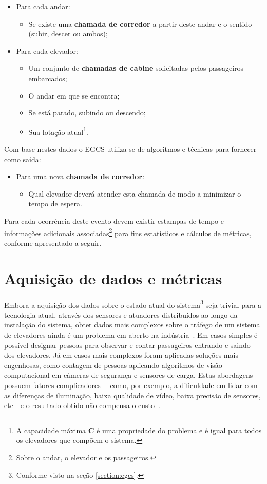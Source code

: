 \begin{itemize}
  \item Para cada andar:
  \begin{itemize}
    \item Se existe uma \textbf{chamada de corredor} a partir deste andar e o
          sentido (subir, descer ou ambos);
  \end{itemize}
  \item Para cada elevador:
  \begin{itemize}
    \item Um conjunto de \textbf{chamadas de cabine} solicitadas pelos
          passageiros embarcados;
    \item O andar em que se encontra;
    \item Se está parado, subindo ou descendo;
    \item Sua lotação atual\footnote{A capacidade máxima \textbf{C} é uma
          propriedade do problema e é igual para todos os elevadores que compõem
          o sistema.}.
  \end{itemize}
\end{itemize}

Com base nestes dados o EGCS utiliza-se de algoritmos e técnicas para fornecer
como saída:

\begin{itemize}
  \item Para uma nova \textbf{chamada de corredor}:
  \begin{itemize}
    \item Qual elevador deverá atender esta chamada de modo a minimizar o tempo de espera.
  \end{itemize}
\end{itemize}

Para cada ocorrência deste evento devem existir estampas de tempo e informações
adicionais associadas\footnote{Sobre o andar, o elevador e os passageiros.} para
fins estatísticos e cálculos de métricas, conforme apresentado a seguir.

\section{\label{section:data}Aquisição de dados e métricas}

Embora a aquisição dos dados sobre o estado atual do sistema\footnote{Conforme
visto na seção \ref{section:egcs}.} seja trivial para a tecnologia atual,
através dos sensores e atuadores distribuídos ao longo da instalação do sistema,
obter dados mais complexos sobre o tráfego de um sistema de elevadores ainda é
um problema em aberto na indústria~\cite{KOEHLEROTTIGER02}. Em casos simples é
possível designar pessoas para observar e contar passageiros entrando e saindo
dos elevadores. Já em casos mais complexos foram aplicadas soluções mais
engenhosas, como contagem de pessoas aplicando algoritmos de visão computacional
em câmeras de segurança e sensores de carga. Estas abordagens possuem fatores
complicadores~-~como, por exemplo, a dificuldade em lidar com as diferenças de
iluminação, baixa qualidade de vídeo, baixa precisão de sensores, etc - e o
resultado obtido não compensa o custo~\cite{KOEHLEROTTIGER02}.

